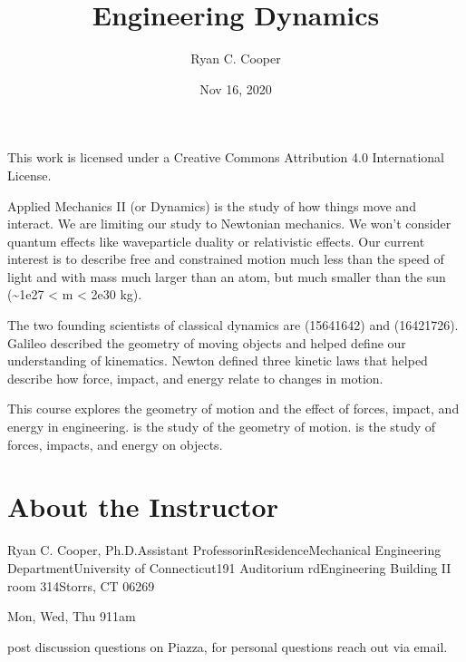 \documentclass[letterpaper,10pt,english]{sphinxmanual}
\title{Engineering Dynamics}
\date{Nov 16, 2020}
\author{Ryan C.\@{} Cooper}
\begin{document}
\pagestyle{empty}
\sphinxmaketitle
\pagestyle{plain}
\sphinxtableofcontents
\pagestyle{normal}
\label{\detokenize{intro::doc}}


This
work is licensed under a Creative Commons
Attribution 4.0 International License.



Applied Mechanics II (or Dynamics) is the study of how things move and interact.
We are limiting our study to Newtonian mechanics. We won’t consider quantum
effects like wave\sphinxhyphen{}particle duality or relativistic effects. Our current interest
is to describe free and constrained motion much less than the speed of light and
with mass much larger than an atom, but much smaller than the sun (\textasciitilde{}1e\sphinxhyphen{}27 \textless{} m \textless{}
2e30 kg).

The two founding scientists of classical dynamics are  (1564\sphinxhyphen{}1642) and  (1642\sphinxhyphen{}1726). Galileo
described the geometry of moving objects and helped define our understanding of
kinematics. Newton defined three kinetic laws that helped describe how force,
impact, and energy relate to changes in motion.

This course explores the geometry of motion and the effect of forces,
impact, and energy in engineering.  is the study of the
geometry of motion.  is the study of forces, impacts, and
energy on objects.




\chapter{About the Instructor}
\label{\detokenize{module_00/meet_cooper:about-the-instructor}}\label{\detokenize{module_00/meet_cooper::doc}}
Ryan C. Cooper, Ph.D.Assistant Professor\sphinxhyphen{}in\sphinxhyphen{}ResidenceMechanical Engineering DepartmentUniversity of Connecticut191 Auditorium rdEngineering Building II room 314Storrs, CT 06269

 

 Mon, Wed, Thu 9\sphinxhyphen{}11am

 post discussion questions on Piazza, for personal
questions reach out via email.
\end{document}
